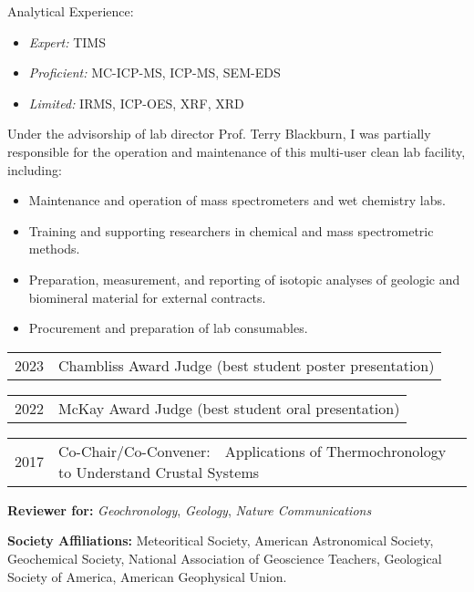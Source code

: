 Analytical Experience:
	\begin{itemize} [label={}]
		\item \textit{Expert:} TIMS
		\item \textit{Proficient:} MC-ICP-MS, ICP-MS, SEM-EDS
		\item \textit{Limited:} IRMS, ICP-OES, XRF, XRD
	\end{itemize} 
Under the advisorship of lab director Prof. Terry Blackburn, I was partially responsible for the operation and maintenance of this multi-user clean lab facility, including:
	\begin{itemize} 
	\item Maintenance and operation of mass spectrometers and wet chemistry labs.
	\item Training and supporting researchers in chemical and mass spectrometric methods.
	\item Preparation, measurement, and reporting of isotopic analyses of geologic and biomineral material for external contracts.
	\item Procurement and preparation of lab consumables.
	\end{itemize}

\begin{tabular}{ll} 
	2023 & Chambliss Award Judge (best student poster presentation)
\end{tabular}

\begin{tabular}{ll} 
	2022 & 	McKay Award Judge (best student oral presentation)
\end{tabular}

\begin{tabular}{ll} 
	2017 & 	Co-Chair/Co-Convener:~~Applications of Thermochronology to Understand Crustal Systems
\end{tabular}

\vspace{2ex}
\begin{hangparas}{5ex}{1}
	\textbf{Reviewer for:} \textit{Geochronology}, \textit{Geology}, \textit{Nature Communications}

	\vspace{2ex}
	\textbf{Society Affiliations:} Meteoritical Society, American Astronomical Society, Geochemical Society, National Association of Geoscience Teachers, Geological Society of America, American Geophysical Union.
\end{hangparas}